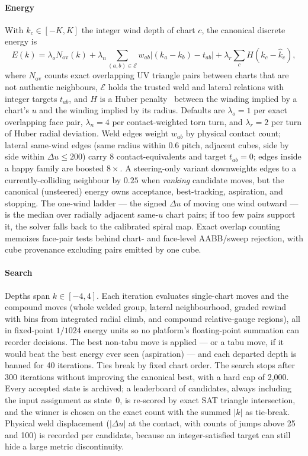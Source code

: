 \paragraph{Energy} With $k_c\in[-K,K]$ the integer wind depth of chart $c$, the canonical discrete energy is
\begin{equation*}
 E(k)=\lambda_o N_{\mathrm{ov}}(k)
   +\lambda_n\!\sum_{(a,b)\in\mathcal E}\!w_{ab}
      \left|(k_a-k_b)-t_{ab}\right|
   +\lambda_r\!\sum_c H(k_c-\widehat{k}_c),
\end{equation*}
where $N_{\mathrm{ov}}$ counts exact overlapping UV triangle pairs between charts that are not authentic neighbours, $\mathcal E$ holds the trusted weld and lateral relations with integer targets $t_{ab}$, and $H$ is a Huber penalty~\cite{huber1964robust} between the winding implied by a chart's $u$ and the winding implied by its radius. Defaults are $\lambda_o = 1$ per exact overlapping face pair, $\lambda_n = 4$ per contact-weighted torn turn, and $\lambda_r = 2$ per turn of Huber radial deviation. Weld edges weight $w_{ab}$ by physical contact count; lateral same-wind edges (same radius within 0.6 pitch, adjacent cubes, side by side within $\Delta u \le 200$) carry 8 contact-equivalents and target $t_{ab} = 0$; edges inside a happy family are boosted $8\times$. A steering-only variant downweights edges to a currently-colliding neighbour by $0.25$ when {\em ranking} candidate moves, but the canonical (unsteered) energy owns acceptance, best-tracking, aspiration, and stopping. The one-wind ladder --- the signed $\Delta u$ of moving one wind outward --- is the median over radially adjacent same-$u$ chart pairs; if too few pairs support it, the solver falls back to the calibrated spiral map. Exact overlap counting memoizes face-pair tests behind chart- and face-level AABB/sweep rejection, with cube provenance excluding pairs emitted by one cube.

\paragraph{Search} Depths span $k \in [-4, 4]$. Each iteration evaluates single-chart moves and the compound moves (whole welded group, lateral neighbourhood, graded rewind with bins from integrated radial climb, and compound relative-gauge regions), all in fixed-point $1/1024$ energy units so no platform's floating-point summation can reorder decisions. The best non-tabu move is applied --- or a tabu move, if it would beat the best energy ever seen (aspiration) --- and each departed depth is banned for 40 iterations. Ties break by fixed chart order. The search stops after 300 iterations without improving the canonical best, with a hard cap of 2{,}000. Every accepted state is archived; a leaderboard of candidates, always including the input assignment as state~0, is re-scored by exact SAT triangle intersection, and the winner is chosen on the exact count with the summed $|k|$ as tie-break. Physical weld displacement ($|\Delta u|$ at the contact, with counts of jumps above 25 and 100) is recorded per candidate, because an integer-satisfied target can still hide a large metric discontinuity.

